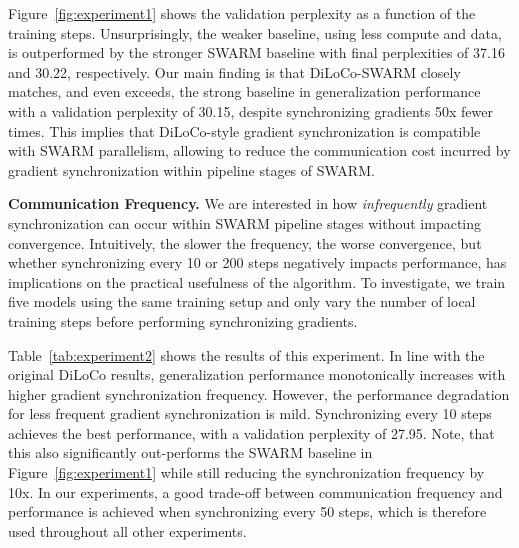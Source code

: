 \documentclass{article}
\begin{document}
Figure~\ref{fig:experiment1} shows the validation perplexity as a function of
the training steps. Unsurprisingly, the weaker baseline, using less compute and
data, is outperformed by the stronger SWARM baseline with final perplexities of 
37.16 and 30.22, respectively. Our main finding is that DiLoCo-SWARM closely
matches, and even exceeds, the strong baseline in generalization performance
with a validation perplexity of 30.15, despite synchronizing gradients 50x fewer
times. This implies that DiLoCo-style gradient synchronization is compatible
with SWARM parallelism, allowing to reduce the communication cost incurred by 
gradient synchronization within pipeline stages of SWARM.

\textbf{Communication Frequency.} We are interested in how \textit{infrequently}
gradient synchronization can occur within SWARM pipeline stages without
impacting convergence. Intuitively, the slower the frequency, the worse
convergence, but whether synchronizing every 10 or 200 steps negatively impacts
performance, has implications on the practical usefulness of the algorithm. To
investigate, we train five models using the same training setup and only vary
the number of local training steps before performing synchronizing gradients.


Table~\ref{tab:experiment2} shows the results of this experiment. In line with
the original DiLoCo results, generalization performance monotonically increases
with higher gradient synchronization frequency. However, the performance
degradation for less frequent gradient synchronization is mild. Synchronizing
every 10 steps achieves the best performance, with a validation perplexity of
27.95. Note, that this also significantly out-performs the SWARM baseline in
Figure~\ref{fig:experiment1} while still reducing the synchronization frequency
by 10x. In our experiments, a good trade-off between communication frequency and
performance is achieved when synchronizing every 50 steps, which is therefore
used throughout all other experiments.
\end{document}
